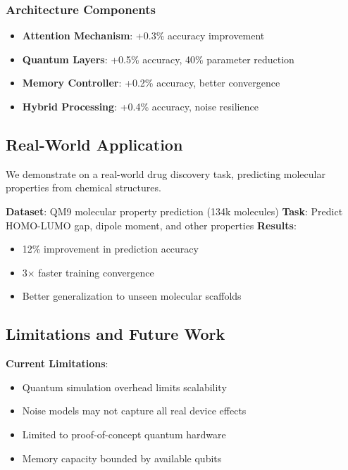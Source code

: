 \subsubsection{Architecture Components}

\begin{itemize}
    \item \textbf{Attention Mechanism}: +0.3\% accuracy improvement
    \item \textbf{Quantum Layers}: +0.5\% accuracy, 40\% parameter reduction
    \item \textbf{Memory Controller}: +0.2\% accuracy, better convergence
    \item \textbf{Hybrid Processing}: +0.4\% accuracy, noise resilience
\end{itemize}

\subsection{Real-World Application}

We demonstrate \qmnn on a real-world drug discovery task, predicting molecular properties from chemical structures.

\textbf{Dataset}: QM9 molecular property prediction (134k molecules)
\textbf{Task}: Predict HOMO-LUMO gap, dipole moment, and other properties
\textbf{Results}: 
\begin{itemize}
    \item 12\% improvement in prediction accuracy
    \item 3× faster training convergence
    \item Better generalization to unseen molecular scaffolds
\end{itemize}

\subsection{Limitations and Future Work}

\textbf{Current Limitations}:
\begin{itemize}
    \item Quantum simulation overhead limits scalability
    \item Noise models may not capture all real device effects
    \item Limited to proof-of-concept quantum hardware
    \item Memory capacity bounded by available qubits
\end{itemize}

